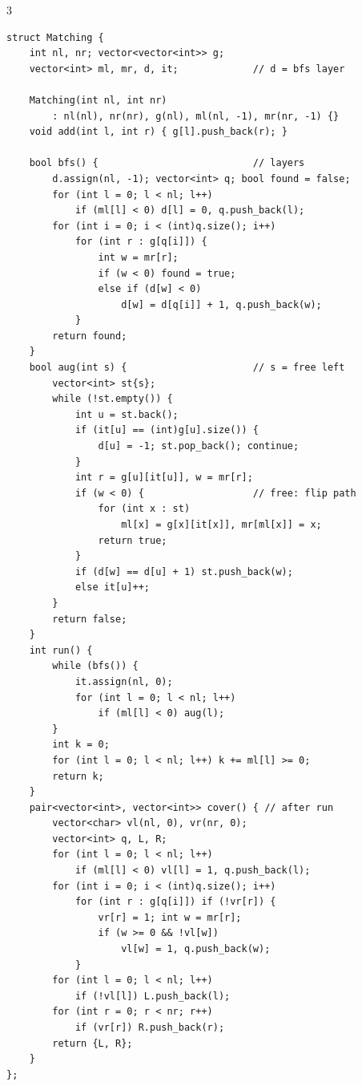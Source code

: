 \documentclass[9pt,a4paper]{extarticle}
\begin{document}
\begin{multicols*}{3}
\begin{lstlisting}
struct Matching {
    int nl, nr; vector<vector<int>> g;
    vector<int> ml, mr, d, it;             // d = bfs layer

    Matching(int nl, int nr)
        : nl(nl), nr(nr), g(nl), ml(nl, -1), mr(nr, -1) {}
    void add(int l, int r) { g[l].push_back(r); }

    bool bfs() {                           // layers
        d.assign(nl, -1); vector<int> q; bool found = false;
        for (int l = 0; l < nl; l++)
            if (ml[l] < 0) d[l] = 0, q.push_back(l);
        for (int i = 0; i < (int)q.size(); i++)
            for (int r : g[q[i]]) {
                int w = mr[r];
                if (w < 0) found = true;
                else if (d[w] < 0)
                    d[w] = d[q[i]] + 1, q.push_back(w);
            }
        return found;
    }
    bool aug(int s) {                      // s = free left
        vector<int> st{s};
        while (!st.empty()) {
            int u = st.back();
            if (it[u] == (int)g[u].size()) {
                d[u] = -1; st.pop_back(); continue;
            }
            int r = g[u][it[u]], w = mr[r];
            if (w < 0) {                   // free: flip path
                for (int x : st)
                    ml[x] = g[x][it[x]], mr[ml[x]] = x;
                return true;
            }
            if (d[w] == d[u] + 1) st.push_back(w);
            else it[u]++;
        }
        return false;
    }
    int run() {
        while (bfs()) {
            it.assign(nl, 0);
            for (int l = 0; l < nl; l++)
                if (ml[l] < 0) aug(l);
        }
        int k = 0;
        for (int l = 0; l < nl; l++) k += ml[l] >= 0;
        return k;
    }
    pair<vector<int>, vector<int>> cover() { // after run
        vector<char> vl(nl, 0), vr(nr, 0);
        vector<int> q, L, R;
        for (int l = 0; l < nl; l++)
            if (ml[l] < 0) vl[l] = 1, q.push_back(l);
        for (int i = 0; i < (int)q.size(); i++)
            for (int r : g[q[i]]) if (!vr[r]) {
                vr[r] = 1; int w = mr[r];
                if (w >= 0 && !vl[w])
                    vl[w] = 1, q.push_back(w);
            }
        for (int l = 0; l < nl; l++)
            if (!vl[l]) L.push_back(l);
        for (int r = 0; r < nr; r++)
            if (vr[r]) R.push_back(r);
        return {L, R};
    }
};
\end{lstlisting}


\end{multicols*}
\end{document}
